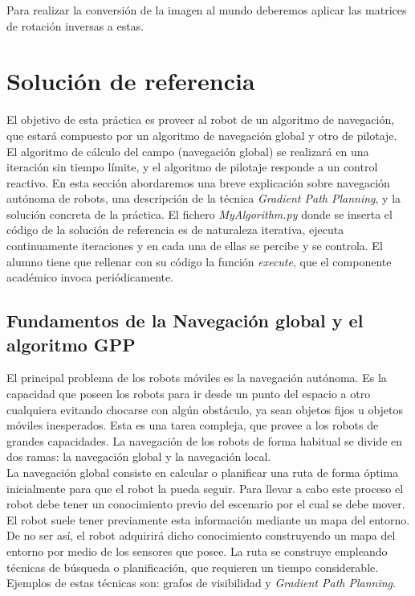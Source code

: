 Para realizar la conversión de la imagen al mundo deberemos aplicar las matrices de rotación inversas a estas. 

\section{Solución de referencia}\label{sec.solucion}
El objetivo de esta práctica es proveer al robot de un algoritmo de navegación, que estará compuesto por un algoritmo de navegación global y otro de pilotaje. El algoritmo de cálculo del campo (navegación global) se realizará en una iteración sin tiempo límite, y el algoritmo de pilotaje responde a un control reactivo. En esta sección abordaremos una breve explicación sobre navegación autónoma de robots, una descripción de la técnica \textit{Gradient Path Planning}, y la solución concreta de la práctica. El fichero \textit{MyAlgorithm.py} donde se inserta el código de la solución de referencia es de naturaleza iterativa, ejecuta continuamente iteraciones y en cada una de ellas se percibe y se controla. El alumno tiene que rellenar con su código la función \textit{execute}, que el componente académico invoca periódicamente.

\subsection{Fundamentos de la Navegación global y el algoritmo GPP}
El principal problema de los robots móviles es la navegación autónoma. Es la capacidad que poseen los robots para ir desde un punto del espacio a otro cualquiera evitando chocarse con algún obstáculo, ya sean objetos fijos u objetos móviles inesperados. Esta es una tarea compleja, que provee a los robots de grandes capacidades. La navegación de los robots de forma habitual se divide en dos ramas: la navegación global y la navegación local.\\

La navegación global consiste en calcular o planificar una ruta de forma óptima inicialmente para que el robot la pueda seguir. Para llevar a cabo este proceso el robot debe tener un conocimiento previo del escenario por el cual se debe mover. El robot suele tener previamente esta información mediante un mapa del entorno. De no ser así, el robot adquirirá dicho conocimiento construyendo un mapa del entorno por medio de los sensores que posee. La ruta se construye empleando técnicas de búsqueda o planificación, que requieren un tiempo considerable. Ejemplos de estas técnicas son: grafos de visibilidad y \textit{Gradient Path Planning}.\\

